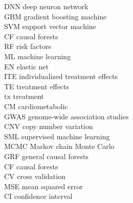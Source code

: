 \newpage
\noindent
DNN       \hfill deep neuron network                  \\
GBM       \hfill gradient boosting machine            \\
SVM       \hfill support vector machine               \\
CF        \hfill causal forests                       \\
RF        \hfill risk factors                         \\
ML        \hfill machine learning                     \\
EN        \hfill elastic net                          \\
ITE       \hfill individualized treatment effects         \\
TE        \hfill treatment effects                    \\
tx        \hfill treatment                            \\
CM        \hfill cardiometabolic                      \\
GWAS      \hfill genome-wide association studies      \\
CNV       \hfill copy number variation                \\
SML       \hfill supervised machine learning          \\ 
MCMC      \hfill Markov chain Monte Carlo             \\
GRF       \hfill general causal forests               \\
CF        \hfill causal forests                       \\
CV        \hfill cross validation                     \\
MSE       \hfill mean squared error                   \\
CI        \hfill confidence interval                  \\

